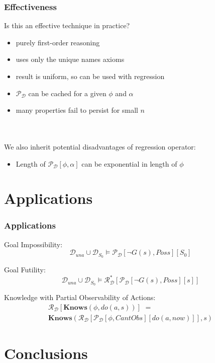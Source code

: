 \documentclass[compress]{beamer}
\begin{document}
\begin{frame}
\frametitle{Effectiveness}
Is this an effective technique in practice?
\begin{itemize}
 \item purely first-order reasoning
 \item uses only the unique names axioms
 \item result is uniform, so can be used with regression
 \item $\mathcal{P}_{\mathcal{D}}$ can be cached for a given $\phi$ and $\alpha$
 \item many properties fail to persist for small $n$
\end{itemize}
\ \\
\ \\
We also inherit potential disadvantages of regression operator:
\begin{itemize}
  \item Length of $\mathcal{P}_{\mathcal{D}}[\phi,\alpha]$ can be exponential in length of $\phi$
\end{itemize}
\end{frame}

\section{Applications}

\begin{frame}
\frametitle{Applications}
Goal Impossibility:
\begin{equation*}
\mathcal{D}_{una}\cup\mathcal{D}_{S_0} \models \mathcal{P}_{\mathcal{D}}[\neg G(s),Poss][S_0]
\end{equation*}

Goal Futility:
\begin{equation*}
\mathcal{D}_{una}\cup\mathcal{D}_{S_0} \models \mathcal{R}^*_{\mathcal{D}}[\mathcal{P}_{\mathcal{D}}[\neg G(s),Poss][s]]
\end{equation*}

Knowledge with Partial Observability of Actions:
\begin{multline*}
\mathcal{R}_{\mathcal{D}}[\mathbf{Knows}(\phi,do(a,s))]\,\,=\\
  \mathbf{Knows}(\mathcal{R}_{\mathcal{D}}[\mathcal{P}_{\mathcal{D}}[\phi,CantObs][do(a,now)]],s)
\end{multline*}
\end{frame}

\section{Conclusions}
\end{document}
